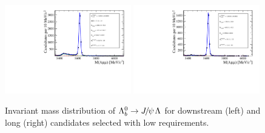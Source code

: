 \begin{figure}
\centering
\includegraphics[width=0.49\textwidth]{Lmumu/figs/MassFits/Lb2JpsiL__lowSel_DD_data.pdf}
\includegraphics[width=0.49\textwidth]{Lmumu/figs/MassFits/Lb2JpsiL__lowSel_LL_data.pdf}
\caption{Invariant mass distribution of $\Lb\ra\jpsi\Lz$ for downstream (left) and long (right) candidates
 selected with low \qsq requirements.}
\label{fig:Lb_totalFit_low}
\end{figure}
%
%
